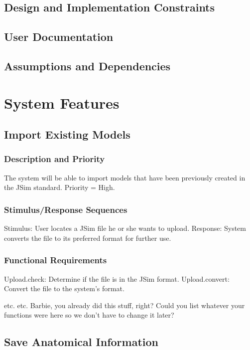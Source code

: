 \documentclass{article}
\begin{document}
\subsection{Design and Implementation Constraints}
\subsection{User Documentation}
\subsection{Assumptions and Dependencies}

\section{System Features}

\subsection{Import Existing Models}

\subsubsection{Description and Priority}
The system will be able to import models that have been previously created in the JSim standard.
Priority = High.

\subsubsection{Stimulus/Response Sequences}

Stimulus: User locates a JSim file he or she wants to upload.
Response: System converts the file to its preferred format for further use.

\subsubsection{Functional Requirements}
Upload.check: Determine if the file is in the JSim format.
Upload.convert: Convert the file to the system's format.

etc. etc. Barbie, you already did this stuff, right?  Could you list whatever your functions were here so we don't have to change it later?

\subsection{Save Anatomical Information}
\end{document}
